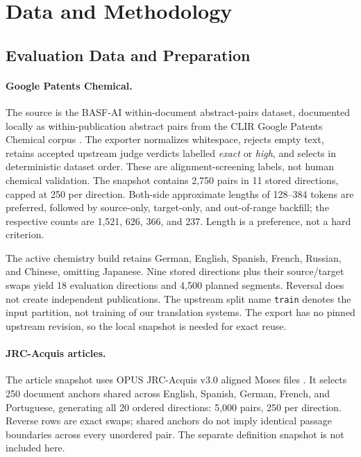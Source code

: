 \section{Data and Methodology}
\label{sec:methods}

\subsection{Evaluation Data and Preparation}
\label{sec:data}

\paragraph{Google Patents Chemical.}
The source is the BASF-AI within-document abstract-pairs dataset, documented
locally as within-publication abstract pairs from the CLIR Google Patents Chemical corpus
\cite{basfpatents}. The exporter normalizes whitespace, rejects empty text, retains accepted upstream
judge verdicts labelled \emph{exact} or \emph{high}, and selects in deterministic dataset order.
These are alignment-screening labels, not human chemical validation. The snapshot contains 2,750
pairs in 11 stored directions, capped at 250 per direction. Both-side approximate lengths of
128--384 tokens are preferred, followed by source-only, target-only, and out-of-range backfill;
the respective counts are 1,521, 626, 366, and 237. Length is a preference, not a hard criterion.

The active chemistry build retains German, English, Spanish, French, Russian, and Chinese,
omitting Japanese. Nine stored directions plus their source/target swaps yield 18 evaluation
directions and 4,500 planned segments. Reversal does not create independent publications.
The upstream split name \texttt{train} denotes the input partition, not training of our translation
systems. The export has no pinned upstream revision, so the local snapshot is needed for exact reuse.

\paragraph{JRC-Acquis articles.}
The article snapshot uses OPUS JRC-Acquis v3.0 aligned Moses files
\cite{steinberger2006,tiedemann2012}. It selects 250 document anchors shared across English,
Spanish, German, French, and Portuguese, generating all 20 ordered directions: 5,000 pairs,
250 per direction. Reverse rows are exact swaps; shared anchors do not imply identical passage
boundaries across every unordered pair. The separate definition snapshot is not included here.

